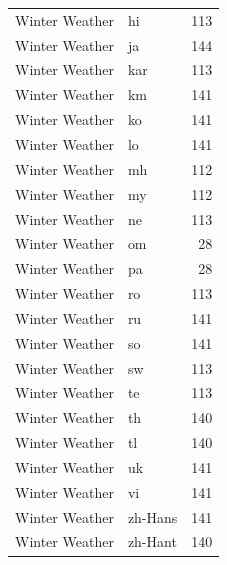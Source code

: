 \begin{longtable}{p{3cm} p{3cm} r}
Winter Weather & hi & 113 \\
Winter Weather & ja & 144 \\
Winter Weather & kar & 113 \\
Winter Weather & km & 141 \\
Winter Weather & ko & 141 \\
Winter Weather & lo & 141 \\
Winter Weather & mh & 112 \\
Winter Weather & my & 112 \\
Winter Weather & ne & 113 \\
Winter Weather & om & 28 \\
Winter Weather & pa & 28 \\
Winter Weather & ro & 113 \\
Winter Weather & ru & 141 \\
Winter Weather & so & 141 \\
Winter Weather & sw & 113 \\
Winter Weather & te & 113 \\
Winter Weather & th & 140 \\
Winter Weather & tl & 140 \\
Winter Weather & uk & 141 \\
Winter Weather & vi & 141 \\
Winter Weather & zh-Hans & 141 \\
Winter Weather & zh-Hant & 140 \\
\end{longtable}